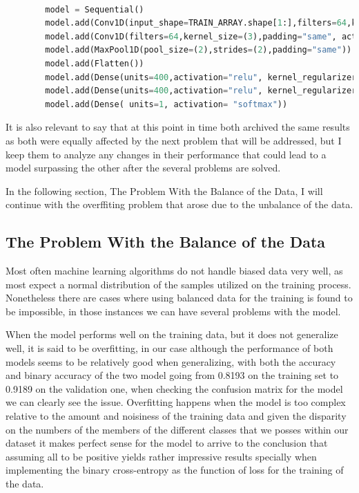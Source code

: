 \documentclass[12pt, a4paper]{article}
\begin{document}
		
	\vspace{5mm}
	
	\begin{lstlisting}[language=Python]
		
		model = Sequential() 
		model.add(Conv1D(input_shape=TRAIN_ARRAY.shape[1:],filters=64,kernel_size=(3),padding="same", activation="relu"))
		model.add(Conv1D(filters=64,kernel_size=(3),padding="same", activation="relu"))
		model.add(MaxPool1D(pool_size=(2),strides=(2),padding="same"))
		model.add(Flatten())
		model.add(Dense(units=400,activation="relu", kernel_regularizer='l2'))
		model.add(Dense(units=400,activation="relu", kernel_regularizer='l2'))
		model.add(Dense( units=1, activation= "softmax"))
	\end{lstlisting}
	
	\vspace{5mm}
	
	It is also relevant to say that at this point in time both archived the same results as both were equally affected by the next problem that will be addressed, but I keep them to analyze any changes in their performance that could lead to a model surpassing the other after the several problems are solved.
	
	In the following section, The Problem With the Balance of the Data, I will continue with the overffiting problem that arose due to the unbalance of the data.
	
	\clearpage
	
	\subsection{The Problem With the Balance of the Data}
	\label{problemUnbalanceData}
	
	Most often machine learning algorithms do not handle biased data very well, as most expect a normal distribution of the samples utilized on the training process. Nonetheless there are cases where using balanced data for the training is found to be impossible, in those instances we can have several problems with the model.
	
	When the model performs well on the training data, but it does not generalize well, it is said to be overfitting, in our case although the performance of both models seems to be relatively good when generalizing, with both the accuracy and binary accuracy of the two model going from 0.8193 on the training set to 0.9189 on the validation one, when checking the confusion matrix for the model we can clearly see the issue. Overfitting happens when the model is too complex relative to the amount and noisiness of the training data and given the disparity on the numbers of the members of the different classes that we posses within our dataset it makes perfect sense for the model to arrive to the conclusion that assuming all to be positive yields rather impressive results specially when implementing the binary cross-entropy as the function of loss for the training of the data.
		
\end{document}
